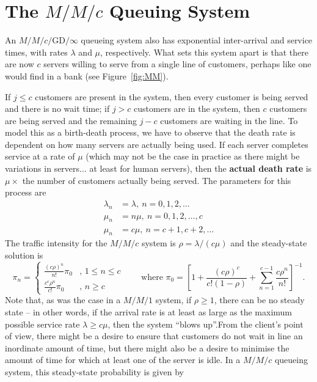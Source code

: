 \section{The $M/M/c$ Queuing System}
An $M/M/c/\textrm{GD}/\infty$ queueing system also has exponential inter-arrival and service times, with rates $\lambda$ and $\mu$, respectively. What sets this system apart is that there are now $c$ servers willing to serve from a single line of customers, perhaps like one would find in a bank (see Figure~\ref{fig:MM}). \par If $j \leq c$ customers are present in the system, then every customer is being served and there is no wait time; if $j > c$ customers are in the system, then $c$ customers are being served and the remaining $j - c$ customers are waiting in the line. \newl
To model this as a birth-death process, we have to observe that the death rate is dependent on how many servers are actually being used. \newpage\noindent If each server completes service at a rate of $\mu$ (which may not be the case in practice as there might be variations in servers... at least for human servers), then the \textbf{actual death rate} is $\mu \times$ the number of customers actually being served. The parameters for this process are
\begin{align*}
\lambda_{n} &= \lambda, \ n=0,1,2,\ldots \\ 
\mu_n &= n\mu, \ n=0,1,2, \ldots, c \\
\mu_{n} &= c\mu,\  n=c+1,c+2,\ldots 
\end{align*}
The traffic intensity for the $M/M/c$ system is $\rho = \lambda/(c \mu)$ and the steady-state solution is 
\begin{equation} 
 \pi_{n} = 
\begin{cases}
     \frac{\left(c \rho\right)^{n}}{n!} \pi_{0}      & \text{, $1\leq n \leq c$}  \\ 
     \frac{c^{c} \rho^{n}}{c!} \pi_{0}   & \text{, $n \geq c$} 
\end{cases}
\nonumber\qquad  \text{where  }
\pi_{0} = \left[1 + \frac{\left(c \rho\right)^{c}}{c! \left(1-\rho\right)} + \sum^{c-1}_{n=1} \frac{c \rho^{n}}{n!}\right]^{-1}.
\end{equation}
\normalsize  
Note that, as was the case in a $M/M/1$ system, if $\rho \geq 1$, there can be no steady state -- in other words, if the arrival rate is at least as large as the maximum possible service rate $\lambda \geq c \mu$, then the system ``blows up''.\newl From the client's point of view, there might be a desire to ensure that customers do not wait in line an inordinate amount of time, but there might also be a desire to minimise the amount of time for which at least one of the server is idle. In a $M/M/c$ queueing system, this steady-state probability is given by 
